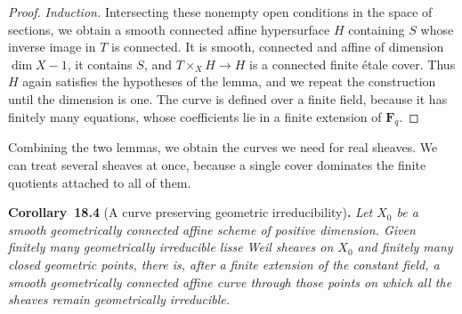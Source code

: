 \documentclass[11pt]{article}
\newenvironment{bpstatement}[2]{\par\addvspace{0.6\baselineskip}\noindent\textbf{#1}#2\textbf{.}\enspace\ignorespaces}
  {\par\addvspace{0.4\baselineskip}}
\newenvironment{bpstatementit}[2]{\begin{bpstatement}{#1}{#2}\itshape\ignorespaces}{\end{bpstatement}}
\begin{document}
\begin{proof}[{Proof}]
\emph{Induction.} Intersecting these nonempty open conditions in the space of sections, we obtain a smooth connected affine hypersurface \(H\) containing \(S\) whose inverse image in \(T\) is connected. It is smooth, connected and affine of dimension \(\dim X-1\), it contains \(S\), and \(T\times_XH\to H\) is a connected finite étale cover. Thus \(H\) again satisfies the hypotheses of the lemma, and we repeat the construction until the dimension is one. The curve is defined over a finite field, because it has finitely many equations, whose coefficients lie in a finite extension of \(\mathbf F_q\).
\end{proof}

\label{bp13}%
Combining the two lemmas, we obtain the curves we need for real sheaves. We can treat several sheaves at once, because a single cover dominates the finite quotients attached to all of them.

\label{bp14}%
\begin{bpstatementit}{Corollary~18.4}{ (A curve preserving geometric irreducibility)}
Let \(X_0\) be a smooth geometrically connected affine scheme of positive dimension. Given finitely many geometrically irreducible lisse Weil sheaves on \(X_0\) and finitely many closed geometric points, there is, after a finite extension of the constant field, a smooth geometrically connected affine curve through those points on which all the sheaves remain geometrically irreducible.
\end{bpstatementit}
\end{document}
